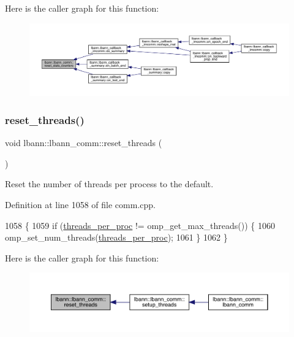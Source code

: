 Here is the caller graph for this function\+:\nopagebreak
\begin{figure}[H]
\begin{center}
\leavevmode
\includegraphics[width=350pt]{classlbann_1_1lbann__comm_adb9afab1b8af03276e6e6347f8021ef5_icgraph}
\end{center}
\end{figure}
\mbox{\label{classlbann_1_1lbann__comm_a10f13918019cd2e021768e3388355ba2}} 
\subsubsection{\texorpdfstring{reset\+\_\+threads()}{reset\_threads()}}
{\footnotesize\ttfamily void lbann\+::lbann\+\_\+comm\+::reset\+\_\+threads (\begin{DoxyParamCaption}{ }\end{DoxyParamCaption})}

Reset the number of threads per process to the default. 

Definition at line 1058 of file comm.\+cpp.


\begin{DoxyCode}
1058                                \{
1059   \textcolor{keywordflow}{if} (\hyperlink{classlbann_1_1lbann__comm_a23ff8e3563e4472af29d15f6cb823bc1}{threads\_per\_proc} != omp\_get\_max\_threads()) \{
1060     omp\_set\_num\_threads(\hyperlink{classlbann_1_1lbann__comm_a23ff8e3563e4472af29d15f6cb823bc1}{threads\_per\_proc});
1061   \}
1062 \}
\end{DoxyCode}
Here is the caller graph for this function\+:\nopagebreak
\begin{figure}[H]
\begin{center}
\leavevmode
\includegraphics[width=350pt]{classlbann_1_1lbann__comm_a10f13918019cd2e021768e3388355ba2_icgraph}
\end{center}
\end{figure}
\mbox{\label{classlbann_1_1lbann__comm_a88162511dc2733dccd9c245e6c7ba53b}} 
